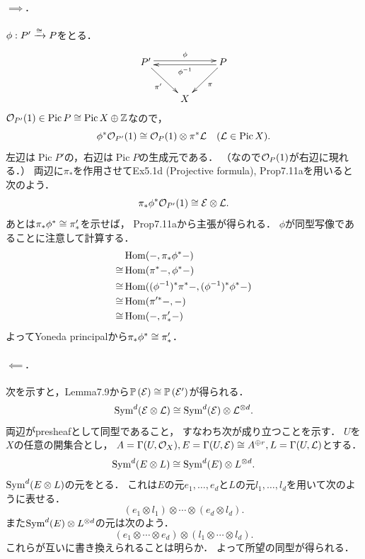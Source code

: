 \documentclass[a4paper]{jsarticle}
\newcommand{\Pic}{\operatorname{Pic}}
\newcommand{\pbundle}{\mathbb{P}\,}
\begin{document}
    \paragraph{$\implies$.}
    $\phi: P' \xrightarrow{\cong} P$をとる．
    \[
        \xymatrix
        {
            P' \ar@<2pt>[rr]^-{\phi}\ar[rd]_-{\pi'}& {} &\ar@<2pt>[ll]^-{\phi^{-1}} P \ar[ld]^-{\pi} \\
            {} & X & {}
        }
    \]
    $\shO_{P'}(1) \in \Pic P \iso \Pic X \oplus \Z$なので，
    \[ \phi^* \shO_{P'}(1) \iso \shO_P(1) \otimes \pi^* \shL ~~~(\shL \in \Pic X). \]
    左辺は$\Pic P'$の，右辺は$\Pic P$の生成元である．
    （なので$\mathcal{O}_P(1)$が右辺に現れる．）
    両辺に$\pi_*$を作用させてEx5.1d (Projective formula), Prop7.11aを用いると次のよう．
    \[ \pi_*\phi^* \mathcal{O}_{P'}(1) \cong \mathcal{E} \otimes \mathcal{L}. \]
    あとは$\pi_* \phi^* \cong \pi'_*$を示せば，
    Prop7.11aから主張が得られる．
    $\phi$が同型写像であることに注意して計算する．
    \begin{align*}
        {}&     \operatorname{Hom}(-, \pi_* \phi^* -) \\
        \cong&   \operatorname{Hom}(\pi^* -, \phi^* -) \\
        \cong&   \operatorname{Hom}((\phi^{-1})^*\pi^* -, (\phi^{-1})^*\phi^* -) \\
        \cong&   \operatorname{Hom}(\pi'^* -, -) \\
        \cong&   \operatorname{Hom}(-, \pi'_* -)
    \end{align*}
    よってYoneda principalから$\pi_* \phi^* \cong \pi'_*$．

    \paragraph{$\impliedby$.}
    次を示すと，Lemma7.9から$\pbundle(\shE) \iso \pbundle(\shE')$が得られる．
    \[ \operatorname{Sym}^d(\mathcal{E} \otimes \mathcal{L}) \cong \operatorname{Sym}^d(\mathcal{E}) \otimes \mathcal{L}^{\otimes d}. \]
    両辺がpresheafとして同型であること，
    すなわち次が成り立つことを示す．
    $U$を$X$の任意の開集合とし，
    $A=\Gamma(U, \mathcal{O}_X), E=\Gamma(U, \mathcal{E}) \cong A^{\oplus r}, L=\Gamma(U, \mathcal{L})$とする．
    \[ \operatorname{Sym}^d(E \otimes L) \cong \operatorname{Sym}^d(E) \otimes L^{\otimes d}. \]
    $\operatorname{Sym}^d(E \otimes L)$の元をとる．
    これは$E$の元$e_1,\dots,e_d$と$L$の元$l_1,\dots,l_d$を用いて次のように表せる．
    \[ (e_1 \otimes l_1) \otimes \cdots \otimes (e_d \otimes l_d). \]
    また$\operatorname{Sym}^d(E) \otimes L^{\otimes d}$の元は次のよう．
    \[ (e_1 \otimes \cdots \otimes e_d) \otimes (l_1 \otimes \cdots \otimes l_d). \]
    これらが互いに書き換えられることは明らか．
    よって所望の同型が得られる．
\end{document}
